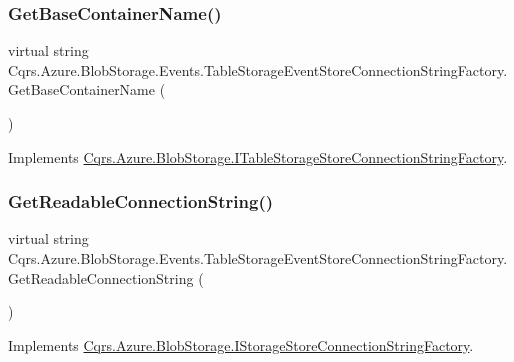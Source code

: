 \subsubsection{\texorpdfstring{Get\+Base\+Container\+Name()}{GetBaseContainerName()}}
{\footnotesize\ttfamily virtual string Cqrs.\+Azure.\+Blob\+Storage.\+Events.\+Table\+Storage\+Event\+Store\+Connection\+String\+Factory.\+Get\+Base\+Container\+Name (\begin{DoxyParamCaption}{ }\end{DoxyParamCaption})\hspace{0.3cm}{\ttfamily [virtual]}}



Implements \hyperlink{interfaceCqrs_1_1Azure_1_1BlobStorage_1_1ITableStorageStoreConnectionStringFactory_a1b9bfc9dcb7292e62619fc46e4a85982}{Cqrs.\+Azure.\+Blob\+Storage.\+I\+Table\+Storage\+Store\+Connection\+String\+Factory}.

\mbox{\label{classCqrs_1_1Azure_1_1BlobStorage_1_1Events_1_1TableStorageEventStoreConnectionStringFactory_a047e58aa30e97231dc913df350bc2446}} 
\subsubsection{\texorpdfstring{Get\+Readable\+Connection\+String()}{GetReadableConnectionString()}}
{\footnotesize\ttfamily virtual string Cqrs.\+Azure.\+Blob\+Storage.\+Events.\+Table\+Storage\+Event\+Store\+Connection\+String\+Factory.\+Get\+Readable\+Connection\+String (\begin{DoxyParamCaption}{ }\end{DoxyParamCaption})\hspace{0.3cm}{\ttfamily [virtual]}}



Implements \hyperlink{interfaceCqrs_1_1Azure_1_1BlobStorage_1_1IStorageStoreConnectionStringFactory_a0ed836289e048767f753630bbcc98d5d}{Cqrs.\+Azure.\+Blob\+Storage.\+I\+Storage\+Store\+Connection\+String\+Factory}.

